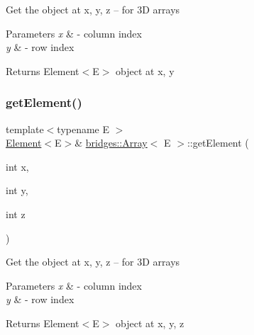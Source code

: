 Get the object at x, y, z -- for 3D arrays


\begin{DoxyParams}{Parameters}
{\em x} & -\/ column index \\
\hline
{\em y} & -\/ row index\\
\hline
\end{DoxyParams}
\begin{DoxyReturn}{Returns}
Element$<$\+E$>$ object at x, y 
\end{DoxyReturn}
\mbox{\label{classbridges_1_1_array_a7006eeac547c391cb7e8eb19c56ae9f6}} 
\subsubsection{\texorpdfstring{get\+Element()}{getElement()}\hspace{0.1cm}{\footnotesize\ttfamily [3/3]}}
{\footnotesize\ttfamily template$<$typename E $>$ \\
\mbox{\hyperlink{classbridges_1_1_element}{Element}}$<$E$>$\& \mbox{\hyperlink{classbridges_1_1_array}{bridges\+::\+Array}}$<$ E $>$\+::get\+Element (\begin{DoxyParamCaption}\item[{int}]{x,  }\item[{int}]{y,  }\item[{int}]{z }\end{DoxyParamCaption})\hspace{0.3cm}{\ttfamily [inline]}}

Get the object at x, y, z -- for 3D arrays


\begin{DoxyParams}{Parameters}
{\em x} & -\/ column index \\
\hline
{\em y} & -\/ row index\\
\hline
\end{DoxyParams}
\begin{DoxyReturn}{Returns}
Element$<$\+E$>$ object at x, y, z 
\end{DoxyReturn}
\mbox{\label{classbridges_1_1_array_a31edfcff05dd4102fee1840ee915319e}} 
